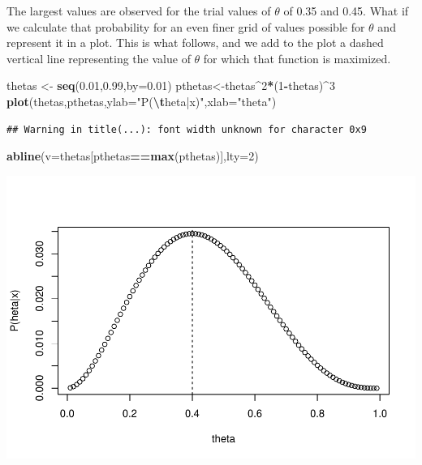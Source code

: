 \documentclass[
]{book}
\newenvironment{Shaded}{\begin{snugshade}}{\end{snugshade}}
\newcommand{\AttributeTok}[1]{\textcolor[rgb]{0.13,0.29,0.53}{#1}}
\newcommand{\DecValTok}[1]{\textcolor[rgb]{0.00,0.00,0.81}{#1}}
\newcommand{\FloatTok}[1]{\textcolor[rgb]{0.00,0.00,0.81}{#1}}
\newcommand{\FunctionTok}[1]{\textcolor[rgb]{0.13,0.29,0.53}{\textbf{#1}}}
\newcommand{\NormalTok}[1]{#1}
\newcommand{\OtherTok}[1]{\textcolor[rgb]{0.56,0.35,0.01}{#1}}
\newcommand{\SpecialCharTok}[1]{\textcolor[rgb]{0.81,0.36,0.00}{\textbf{#1}}}
\newcommand{\StringTok}[1]{\textcolor[rgb]{0.31,0.60,0.02}{#1}}
\begin{document}
The largest values are observed for the trial values of \(\theta\) of 0.35 and 0.45. What if we calculate that probability for an even finer grid of values possible for \(\theta\) and represent it in a plot. This is what follows, and we add to the plot a dashed vertical line representing the value of \(\theta\) for which that function is maximized.

\begin{Shaded}
\begin{Highlighting}[]
\NormalTok{thetas }\OtherTok{\textless{}{-}} \FunctionTok{seq}\NormalTok{(}\FloatTok{0.01}\NormalTok{,}\FloatTok{0.99}\NormalTok{,}\AttributeTok{by=}\FloatTok{0.01}\NormalTok{)}
\NormalTok{pthetas}\OtherTok{\textless{}{-}}\NormalTok{thetas}\SpecialCharTok{\^{}}\DecValTok{2}\SpecialCharTok{*}\NormalTok{(}\DecValTok{1}\SpecialCharTok{{-}}\NormalTok{thetas)}\SpecialCharTok{\^{}}\DecValTok{3}
\FunctionTok{plot}\NormalTok{(thetas,pthetas,}\AttributeTok{ylab=}\StringTok{"P(}\SpecialCharTok{\textbackslash{}t}\StringTok{heta|x)"}\NormalTok{,}\AttributeTok{xlab=}\StringTok{"theta"}\NormalTok{)}
\end{Highlighting}
\end{Shaded}

\begin{verbatim}
## Warning in title(...): font width unknown for character 0x9
\end{verbatim}

\begin{Shaded}
\begin{Highlighting}[]
\FunctionTok{abline}\NormalTok{(}\AttributeTok{v=}\NormalTok{thetas[pthetas}\SpecialCharTok{==}\FunctionTok{max}\NormalTok{(pthetas)],}\AttributeTok{lty=}\DecValTok{2}\NormalTok{)}
\end{Highlighting}
\end{Shaded}

\includegraphics{ECOMODbook_files/figure-latex/ch13.3-1.pdf}
\end{document}
